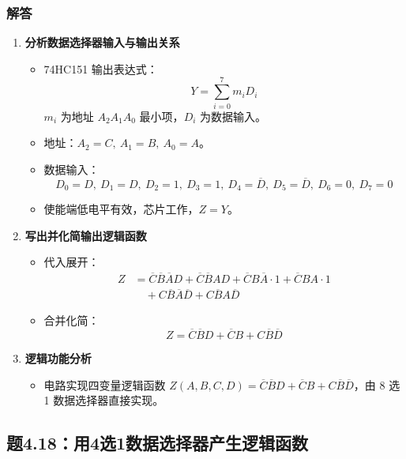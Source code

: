 \subsubsection{解答}
\begin{enumerate}
    \item \textbf{分析数据选择器输入与输出关系}
    \begin{itemize}
        \item 74HC151 输出表达式：
        \[
        Y = \sum_{i=0}^{7} m_i D_i
        \]
        $m_i$ 为地址 $A_2A_1A_0$ 最小项，$D_i$ 为数据输入。
        \item 地址：$A_2=C,\ A_1=B,\ A_0=A$。
        \item 数据输入：
        \[
        D_0=D,\ D_1=D,\ D_2=1,\ D_3=1,\ D_4=\overline{D},\ D_5=\overline{D},\ D_6=0,\ D_7=0
        \]
        \item 使能端低电平有效，芯片工作，$Z=Y$。
    \end{itemize}

    \item \textbf{写出并化简输出逻辑函数}
    \begin{itemize}
        \item 代入展开：
        \[
        \begin{aligned}
        Z &= \overline{C}\overline{B}\overline{A}D + \overline{C}\overline{B}A D
        + \overline{C}B\overline{A} \cdot 1 + \overline{C}B A \cdot 1 \\
        &\quad + C\overline{B}\overline{A}\overline{D} + C\overline{B}A \overline{D}
        \end{aligned}
        \]
        \item 合并化简：
        \[
        Z = \overline{C}\overline{B}D + \overline{C}B + C\overline{B}\overline{D}
        \]
    \end{itemize}

    \item \textbf{逻辑功能分析}
    \begin{itemize}
        \item 电路实现四变量逻辑函数 $Z(A,B,C,D) = \overline{C}\overline{B}D + \overline{C}B + C\overline{B}\overline{D}$，由 8 选 1 数据选择器直接实现。
    \end{itemize}
\end{enumerate}

\subsection{题4.18：用4选1数据选择器产生逻辑函数}
